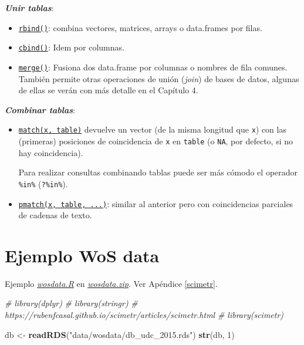 \documentclass[
]{book}
\newenvironment{Shaded}{\begin{snugshade}}{\end{snugshade}}
\newcommand{\CommentTok}[1]{\textcolor[rgb]{0.56,0.35,0.01}{\textit{#1}}}
\newcommand{\DecValTok}[1]{\textcolor[rgb]{0.00,0.00,0.81}{#1}}
\newcommand{\FunctionTok}[1]{\textcolor[rgb]{0.13,0.29,0.53}{\textbf{#1}}}
\newcommand{\NormalTok}[1]{#1}
\newcommand{\OtherTok}[1]{\textcolor[rgb]{0.56,0.35,0.01}{#1}}
\newcommand{\StringTok}[1]{\textcolor[rgb]{0.31,0.60,0.02}{#1}}
\begin{document}
\textbf{\emph{Unir tablas}}:

\begin{itemize}
\item
  \href{https://www.rdocumentation.org/packages/base/versions/3.6.1/topics/rbind}{\texttt{rbind()}}: combina vectores, matrices, arrays o data.frames por filas.
\item
  \href{https://www.rdocumentation.org/packages/base/versions/3.6.1/topics/cbind}{\texttt{cbind()}}: Idem por columnas.
\item
  \href{https://www.rdocumentation.org/packages/base/versions/3.6.1/topics/merge}{\texttt{merge()}}: Fusiona dos data.frame por columnas o nombres de fila comunes. También permite otras operaciones de unión (\emph{join}) de bases de datos, algunas de ellas se verán con más detalle en el Capítulo 4.
\end{itemize}

\textbf{\emph{Combinar tablas}}:

\begin{itemize}
\item
  \href{https://www.rdocumentation.org/packages/base/versions/3.6.1/topics/match}{\texttt{match(x,\ table)}} devuelve un vector (de la misma longitud que \texttt{x}) con las (primeras) posiciones de coincidencia de \texttt{x} en \texttt{table} (o \texttt{NA}, por defecto, si no hay coincidencia).

  Para realizar consultas combinando tablas puede ser más cómodo el operador \texttt{\%in\%} (\texttt{?\textquotesingle{}\%in\%\textquotesingle{}}).
\item
  \href{https://www.rdocumentation.org/packages/base/versions/3.6.1/topics/pmatch}{\texttt{pmatch(x,\ table,\ ...)}}: similar al anterior pero con coincidencias parciales de cadenas de texto.
\end{itemize}

\hypertarget{ejemplo-wos-data}{%
\section{Ejemplo WoS data}\label{ejemplo-wos-data}}

Ejemplo \href{data/wosdata.R}{\emph{wosdata.R}} en \href{data/wosdata.zip}{\emph{wosdata.zip}}.
Ver Apéndice \ref{scimetr}.

\begin{Shaded}
\begin{Highlighting}[]
\CommentTok{\# library(dplyr)}
\CommentTok{\# library(stringr)}
\CommentTok{\# https://rubenfcasal.github.io/scimetr/articles/scimetr.html}
\CommentTok{\# library(scimetr)}

\NormalTok{db }\OtherTok{\textless{}{-}} \FunctionTok{readRDS}\NormalTok{(}\StringTok{"data/wosdata/db\_udc\_2015.rds"}\NormalTok{)}
\FunctionTok{str}\NormalTok{(db, }\DecValTok{1}\NormalTok{)}
\end{Highlighting}
\end{Shaded}
\end{document}

